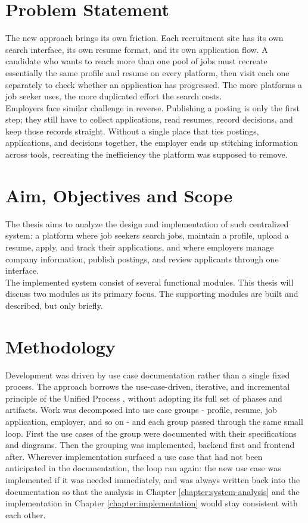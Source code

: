 \section{Problem Statement}

The new approach brings its own friction. Each recruitment site has its own search interface, its own resume format, and its own application flow. A candidate who wants to reach more than one pool of jobs must recreate essentially the same profile and resume on every platform, then visit each one separately to check whether an application has progressed. The more platforms a job seeker uses, the more duplicated effort the search costs.\\
Employers face similar challenge in reverse. Publishing a posting is only the first step; they still have to collect applications, read resumes, record decisions, and keep those records straight. Without a single place that ties postings, applications, and decisions together, the employer ends up stitching information across tools, recreating the inefficiency the platform was supposed to remove.

\section{Aim, Objectives and Scope}

The thesis aims to analyze the design and implementation of such centralized system: a platform where job seekers search jobs, maintain a profile, upload a resume, apply, and track their applications, and where employers manage company information, publish postings, and review applicants through one interface.\\
The implemented system consist of several functional modules. This thesis will discuss two modules as its primary focus. The supporting modules are built and described, but only briefly.

\section{Methodology}

Development was driven by use case documentation rather than a single fixed process. The approach borrows the use-case-driven, iterative, and incremental principle of the Unified Process \cite{jacobson1999unified}, without adopting its full set of phases and artifacts. Work was decomposed into use case groups - profile, resume, job application, employer, and so on - and each group passed through the same small loop. First the use cases of the group were documented with their specifications and diagrams. Then the grouping was implemented, backend first and frontend after. Wherever implementation surfaced a use case that had not been anticipated in the documentation, the loop ran again: the new use case was implemented if it was needed immediately, and was always written back into the documentation so that the analysis in Chapter \ref{chapter:system-analysis} and the implementation in Chapter \ref{chapter:implementation} would stay consistent with each other.\\

